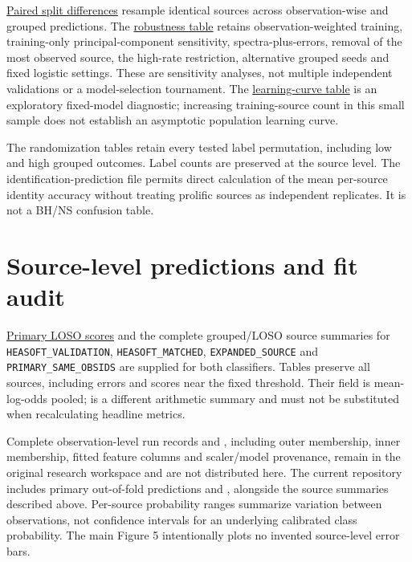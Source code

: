 \documentclass[final,5p,authoryear,nopreprintline]{elsarticle}
\begin{document}
\href{https://github.com/YouhanCW/bhns-source-generalization/blob/3c5bb50b1820ef89f816fc2f4da0fb6c69f359f7/manuscript/supplement/tables/S2_primary_paired_differences.csv}{Paired split differences} resample identical sources across observation-wise and grouped predictions. The \href{https://github.com/YouhanCW/bhns-source-generalization/blob/3c5bb50b1820ef89f816fc2f4da0fb6c69f359f7/manuscript/supplement/tables/S2_primary_robustness.csv}{robustness table} retains observation-weighted training, training-only principal-component sensitivity, spectra-plus-errors, removal of the most observed source, the high-rate restriction, alternative grouped seeds and fixed logistic settings. These are sensitivity analyses, not multiple independent validations or a model-selection tournament. The \href{https://github.com/YouhanCW/bhns-source-generalization/blob/3c5bb50b1820ef89f816fc2f4da0fb6c69f359f7/manuscript/supplement/tables/S2_learning_curve.csv}{learning-curve table} is an exploratory fixed-model diagnostic; increasing training-source count in this small sample does not establish an asymptotic population learning curve.

The randomization tables retain every tested label permutation, including low and high grouped outcomes. Label counts are preserved at the source level. The identification-prediction file permits direct calculation of the mean per-source identity accuracy without treating prolific sources as independent replicates. It is not a BH/NS confusion table.

\section{Source-level predictions and fit audit}

\href{https://github.com/YouhanCW/bhns-source-generalization/blob/3c5bb50b1820ef89f816fc2f4da0fb6c69f359f7/manuscript/supplement/tables/S3_primary_LOSO.csv}{Primary LOSO scores} and the complete grouped/LOSO source summaries for \texttt{HEASOFT\_\allowbreak VALIDATION}, \texttt{HEASOFT\_\allowbreak MATCHED}, \texttt{EXPANDED\_\allowbreak SOURCE} and \texttt{PRIMARY\_\allowbreak SAME\_\allowbreak OBSIDS} are supplied for both classifiers. Tables preserve all sources, including errors and scores near the fixed threshold. Their  field is mean-log-odds pooled;  is a different arithmetic summary and must not be substituted when recalculating headline metrics.

Complete observation-level run records and , including outer membership, inner membership, fitted feature columns and scaler/model provenance, remain in the original research workspace and are not distributed here. The current repository includes primary out-of-fold predictions and , alongside the source summaries described above. Per-source probability ranges summarize variation between observations, not confidence intervals for an underlying calibrated class probability. The main Figure 5 intentionally plots no invented source-level error bars.
\end{document}
